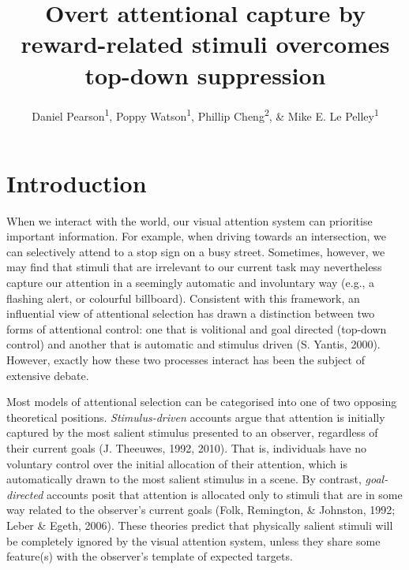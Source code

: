 \documentclass[jou, a4paper, noextraspace,floatsintext]{apa6}
\title{Overt attentional capture by reward-related stimuli overcomes top-down
suppression}
\author{Daniel Pearson\textsuperscript{1}, Poppy Watson\textsuperscript{1},
Phillip Cheng\textsuperscript{2}, \& Mike E. Le
Pelley\textsuperscript{1}}
\date{}
\affiliation{
\vspace{0.5cm}
\textsuperscript{1} School of Psychology, UNSW Sydney\\\textsuperscript{2} Department of Psychology, Macquarie University}
\theoremstyle{definition}
\theoremstyle{definition}
\theoremstyle{definition}
\theoremstyle{remark}
\begin{document}
\maketitle

\section{Introduction}\label{introduction}

When we interact with the world, our visual attention system can
prioritise important information. For example, when driving towards an
intersection, we can selectively attend to a stop sign on a busy street.
Sometimes, however, we may find that stimuli that are irrelevant to our
current task may nevertheless capture our attention in a seemingly
automatic and involuntary way (e.g., a flashing alert, or colourful
billboard). Consistent with this framework, an influential view of
attentional selection has drawn a distinction between two forms of
attentional control: one that is volitional and goal directed (top-down
control) and another that is automatic and stimulus driven (S. Yantis,
2000). However, exactly how these two processes interact has been the
subject of extensive debate.

Most models of attentional selection can be categorised into one of two
opposing theoretical positions. \emph{Stimulus-driven} accounts argue
that attention is initially captured by the most salient stimulus
presented to an observer, regardless of their current goals (J.
Theeuwes, 1992, 2010). That is, individuals have no voluntary control
over the initial allocation of their attention, which is automatically
drawn to the most salient stimulus in a scene. By contrast,
\emph{goal-directed} accounts posit that attention is allocated only to
stimuli that are in some way related to the observer's current goals
(Folk, Remington, \& Johnston, 1992; Leber \& Egeth, 2006). These
theories predict that physically salient stimuli will be completely
ignored by the visual attention system, unless they share some
feature(s) with the observer's template of expected targets.
\end{document}
